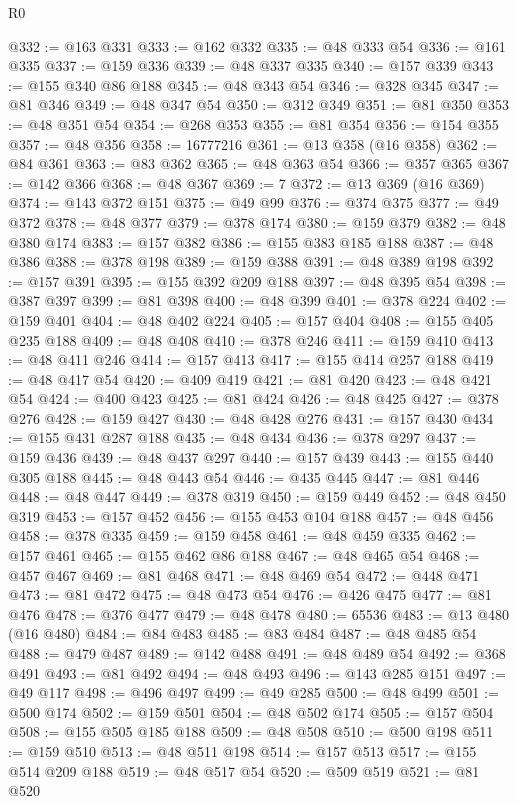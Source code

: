 \begin{lexlean}{R0}
\begin{coremodule}
{{{{{@332 := @163 @331
@333 := @162 @332
@335 := @48 @333 @54
@336 := @161 @335
@337 := @159 @336
@339 := @48 @337 @335
@340 := @157 @339
@343 := @155 @340 @86 @188
@345 := @48 @343 @54
@346 := @328 @345
@347 := @81 @346
@349 := @48 @347 @54
@350 := @312 @349
@351 := @81 @350
@353 := @48 @351 @54
@354 := @268 @353
@355 := @81 @354
@356 := @154 @355
@357 := @48 @356
@358 := 16777216
@361 := @13 @358 (@16 @358)
@362 := @84 @361
@363 := @83 @362
@365 := @48 @363 @54
@366 := @357 @365
@367 := @142 @366
@368 := @48 @367
@369 := 7
@372 := @13 @369 (@16 @369)
@374 := @143 @372 @151
@375 := @49 @99
@376 := @374 @375
@377 := @49 @372
@378 := @48 @377
@379 := @378 @174
@380 := @159 @379
@382 := @48 @380 @174
@383 := @157 @382
@386 := @155 @383 @185 @188
@387 := @48 @386
@388 := @378 @198
@389 := @159 @388
@391 := @48 @389 @198
@392 := @157 @391
@395 := @155 @392 @209 @188
@397 := @48 @395 @54
@398 := @387 @397
@399 := @81 @398
@400 := @48 @399
@401 := @378 @224
@402 := @159 @401
@404 := @48 @402 @224
@405 := @157 @404
@408 := @155 @405 @235 @188
@409 := @48 @408
@410 := @378 @246
@411 := @159 @410
@413 := @48 @411 @246
@414 := @157 @413
@417 := @155 @414 @257 @188
@419 := @48 @417 @54
@420 := @409 @419
@421 := @81 @420
@423 := @48 @421 @54
@424 := @400 @423
@425 := @81 @424
@426 := @48 @425
@427 := @378 @276
@428 := @159 @427
@430 := @48 @428 @276
@431 := @157 @430
@434 := @155 @431 @287 @188
@435 := @48 @434
@436 := @378 @297
@437 := @159 @436
@439 := @48 @437 @297
@440 := @157 @439
@443 := @155 @440 @305 @188
@445 := @48 @443 @54
@446 := @435 @445
@447 := @81 @446
@448 := @48 @447
@449 := @378 @319
@450 := @159 @449
@452 := @48 @450 @319
@453 := @157 @452
@456 := @155 @453 @104 @188
@457 := @48 @456
@458 := @378 @335
@459 := @159 @458
@461 := @48 @459 @335
@462 := @157 @461
@465 := @155 @462 @86 @188
@467 := @48 @465 @54
@468 := @457 @467
@469 := @81 @468
@471 := @48 @469 @54
@472 := @448 @471
@473 := @81 @472
@475 := @48 @473 @54
@476 := @426 @475
@477 := @81 @476
@478 := @376 @477
@479 := @48 @478
@480 := 65536
@483 := @13 @480 (@16 @480)
@484 := @84 @483
@485 := @83 @484
@487 := @48 @485 @54
@488 := @479 @487
@489 := @142 @488
@491 := @48 @489 @54
@492 := @368 @491
@493 := @81 @492
@494 := @48 @493
@496 := @143 @285 @151
@497 := @49 @117
@498 := @496 @497
@499 := @49 @285
@500 := @48 @499
@501 := @500 @174
@502 := @159 @501
@504 := @48 @502 @174
@505 := @157 @504
@508 := @155 @505 @185 @188
@509 := @48 @508
@510 := @500 @198
@511 := @159 @510
@513 := @48 @511 @198
@514 := @157 @513
@517 := @155 @514 @209 @188
@519 := @48 @517 @54
@520 := @509 @519
@521 := @81 @520
}}}}}
\end{coremodule}
\end{lexlean}

